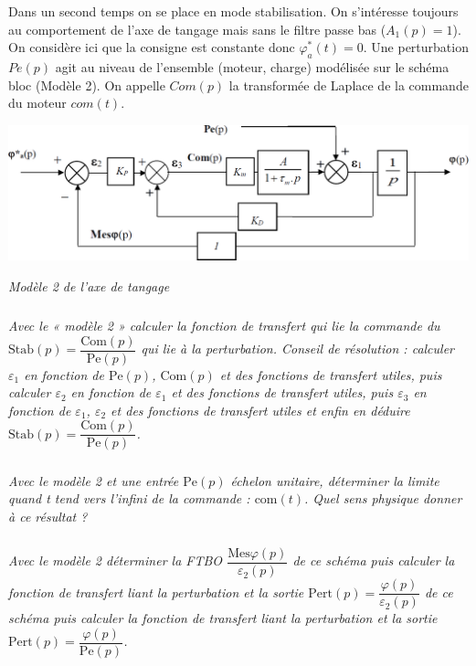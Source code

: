 \documentclass[10pt,fleqn]{article} %
\begin{document}
\begin{multicols}{2}
Dans un second temps on se place en mode stabilisation. On s’intéresse toujours au comportement de l’axe de
tangage mais sans le filtre passe bas ($A_1(p)=1$).
On considère ici que la consigne est constante donc $\varphi^*_a(t)=0$. Une perturbation $Pe(p)$ agit au niveau de l’ensemble (moteur, charge) modélisée sur le schéma bloc (Modèle 2). On appelle $Com(p)$ la transformée de Laplace de la commande du moteur $com(t)$.

\begin{center}
\includegraphics[width=\linewidth]{images/fig_03}

\textit{Modèle 2 de l’axe de tangage}
\end{center}


\subparagraph{}
\textit{Avec le « modèle 2 » calculer la fonction de transfert qui lie la commande du $\text{Stab}(p)=\dfrac{\text{Com}(p)}{\text{Pe}(p)}$
qui lie à la perturbation. Conseil de résolution : calculer $\varepsilon_1$ en fonction de $\text{Pe}(p)$, $\text{Com}(p)$ et des fonctions de transfert utiles, puis calculer $\varepsilon_2$ en fonction de $\varepsilon_1$ et des fonctions de transfert utiles, puis $\varepsilon_3$ en fonction de $\varepsilon_1$, $\varepsilon_2$ et des fonctions de transfert utiles et enfin en déduire $\text{Stab}(p)=\dfrac{\text{Com}(p)}{\text{Pe}(p)}$.}
\ifprof
\begin{corrige}
\end{corrige}
\else
\fi

\subparagraph{}
\textit{Avec le modèle 2 et une entrée $\text{Pe}(p)$ échelon unitaire, déterminer la limite quand t tend vers
l’infini de la commande : $\text{com}(t)$. Quel sens physique donner à ce résultat ?}
\ifprof
\begin{corrige}
\end{corrige}
\else
\fi

\subparagraph{}
\textit{Avec le modèle 2 déterminer la FTBO $\dfrac{\text{Mes}\varphi(p)}{\varepsilon_2(p)}$ de ce schéma puis calculer la fonction de transfert liant la perturbation et la sortie $\text{Pert}(p)=\dfrac{\varphi(p)}{\varepsilon_2(p)}$ de ce schéma puis calculer la fonction de transfert liant la perturbation et la sortie $\text{Pert}(p)=\dfrac{\varphi(p)}{\text{Pe}(p)}$.}
\ifprof
\begin{corrige}
\end{corrige}
\else
\fi




\end{multicols}
\end{document}
